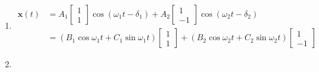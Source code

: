\documentclass{article}
\renewcommand{\vec}[1]{\boldsymbol{\mathbf{#1}}}
\begin{document}
\begin{enumerate}
  \item

        \begin{align*}
          \vec{x}(t) & = A_1 \begin{bmatrix}
                               1 \\
                               1
                             \end{bmatrix} \cos (\omega_1 t - \delta_1) + A_2 \begin{bmatrix}
                                                                                1 \\
                                                                                -1
                                                                              \end{bmatrix} \cos (\omega_2 t - \delta_2)                        \\
                     & = (B_1 \cos \omega_1 t + C_1 \sin \omega_1 t) \begin{bmatrix}
                                                                       1 \\
                                                                       1
                                                                     \end{bmatrix} + (B_2 \cos \omega_2 t + C_2 \sin \omega_2 t) \begin{bmatrix}
                                                                                                                                   1 \\
                                                                                                                                   -1
                                                                                                                                 \end{bmatrix}
        \end{align*}

  \item


\end{enumerate}
\end{document}
